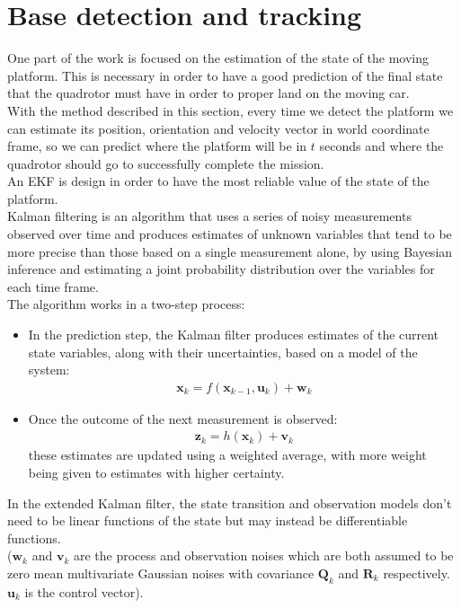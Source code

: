 \chapter{Base detection and tracking}\label{chap:base_tracking}
One part of the work is focused on the estimation of the state of the moving platform. This is necessary in order to have a good prediction of the final state that the quadrotor must have in order to proper land on the moving car. \\ With the method described in this section, every time we detect the platform we can estimate its position, orientation and velocity vector in world coordinate frame, so we can predict where the platform will be in $t$ seconds and where the quadrotor should go to successfully complete the mission.\\ 


An EKF  \cite{kalmanfilter} is design in order to have the most reliable value of the state of the platform.\\
Kalman filtering is an algorithm that uses a series of noisy measurements observed over time and produces estimates of unknown variables that tend to be more precise than those based on a single measurement alone, by using Bayesian inference and estimating a joint probability distribution over the variables for each time frame.\\
The algorithm works in a two-step process:
\begin{itemize}
\item In the prediction step, the Kalman filter produces estimates of the current state variables, along with their uncertainties, based on a model of the system:
\begin{align}
\boldsymbol{x}_k = f(\boldsymbol{x}_{k-1},\boldsymbol{u}_k) + \boldsymbol{w}_k
 \label{eq:ekf1}
\end{align}
\item Once the outcome of the next measurement is observed:
\begin{align}
\boldsymbol{z}_k = h(\boldsymbol{x}_{k}) + \boldsymbol{v}_k
 \label{eq:ekf2}
\end{align}
these estimates are updated using a weighted average, with more weight being given to estimates with higher certainty.
\end{itemize}
In the extended Kalman filter, the state transition and observation models don't need to be linear functions of the state but may instead be differentiable functions.\\
($\boldsymbol{w}_k$ and $\boldsymbol{v}_k$ are the process and observation noises which are both assumed to be zero mean multivariate Gaussian noises with covariance $\boldsymbol{Q}_k$ and $\boldsymbol{R}_k$ respectively. $\boldsymbol{u}_k$ is the control vector).

